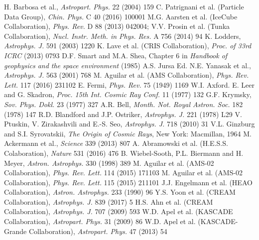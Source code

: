 \documentclass[twoside,12pt]{article}
\begin{document}
\begin{thebibliography}{99}
 H. Barbosa et al., {\it Astropart. Phys.} 22 (2004) 159
 C. Patrignani et al. (Particle Data Group), {\it Chin. Phys.} C 40  (2016) 100001  %
 M.G. Aarsten et al. (IceCube Collaboration), {\it Phys. Rev.} D 88 (2013) 042004; V.V. Prosin et al. (Tunka Collaboration), {\it Nucl. Instr. Meth. in Phys. Res.} A 756 (2014) 94 
 K. Lodders, {\it Astrophys. J.} 591 (2003) 1220   %
 K. Lave et al. (CRIS Collaboration), {\it Proc. of 33rd ICRC} (2013) 0793   %
D.F. Smart and M.A. Shea, Chapter 6 in {\it Handbook of geophysics and the space environment} (1985) A.S. Jursa Ed.  %
 N.E. Yanasak et al., {\it Astrophys. J.} 563 (2001)  768 %
 M. Aguilar et al. (AMS Collaboration), {\it Phys. Rev. Lett.} 117 (2016) 231102  %
 E. Fermi, {\it Phys. Rev.} 75 (1949) 1169
 W.I. Axford. E. Leer and G. Skadron, {\it Proc. 15th Int.
Cosmic Ray Conf.} 11 (1977) 132   %
 G.F. Krymsky, {\it Sov. Phys. Dokl.} 23 (1977) 327 %
 A.R. Bell, {\it Month. Not. Royal Astron. Soc.} 182 (1978) 147 %
 R.D. Blandford and J.P. Ostriker,  {\it Astrophys. J.} 221 (1978) L29 %
  V. Ptuskin, V. Zirakashvili and E.-S. Seo, {\it Astrophys. J.} 718 (2010) 31      %
 	V.L. Ginzburg and S.I. Syrovatskii, {\it The Origin of Cosmic Rays}, New York: Macmillan, 1964 
 M. Ackermann et al., {\it Science} 339 (2013) 807
 A. Abramowski et al. (H.E.S.S. Colaboration), {\it Nature} 531 (2016) 476 %
 B. Wiebel-Sooth, P.L. Biermann and H. Meyer, {\it Astron. Astrophys.} 330 (1998) 389  %
  M. Aguilar et al. (AMS-02 Collaboration), {\it Phys. Rev. Lett.} 114 (2015) 171103   %
 M. Aguilar et al. (AMS-02 Collaboration), {\it Phys. Rev. Lett.} 115 (2015) 211101 %
 J.J. Engelmann et al. (HEAO Collaboration), {\it Astron. Astrophys.} 233 (1990) 96  %
  Y.S. Yoon et al. (CREAM Collaboration), {\it Astrophys. J.} 839 (2017) 5   %
  H.S. Ahn et al. (CREAM Collaboration), {\it Astrophys. J.} 707 (2009) 593   %
   W.D. Apel et al. (KASCADE Collaboration), {\it Astropart. Phys.} 31 (2009) 86   %
 W.D. Apel et al. (KASCADE-Grande Collaboration), {\it Astropart. Phys.} 47 (2013) 54 %

\end{thebibliography}
\end{document}
